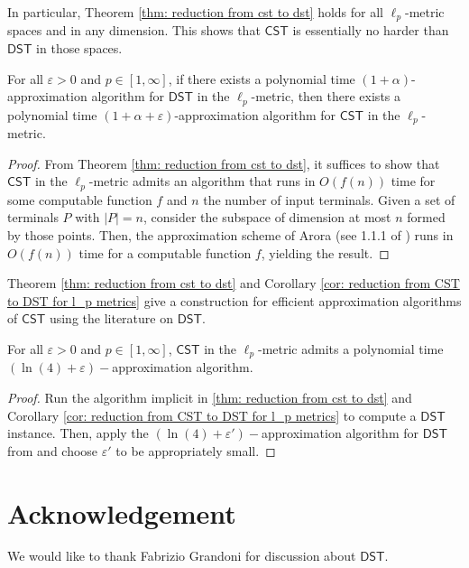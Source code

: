 \documentclass{article}\providecommand{\DeclareRedundantLanguages}[2]{}\usepackage[a4paper,margin=20mm]{geometry}
\newcommand{\1}{\textbf{1}}
\newcommand{\cst}{$\mathsf{CST}$\xspace}
\newcommand{\dst}{$\mathsf{DST}$\xspace}
\begin{document}
In particular, Theorem \ref{thm: reduction from cst to dst} holds for all $\ell_p$-metric spaces and in any dimension. This shows that \cst is essentially no harder than \dst in those spaces.
\begin{corollary} \label{cor: reduction from CST to DST for l_p metrics}
For all $\varepsilon > 0$ and $p \in [1, \infty]$, if there exists a polynomial time $(1 + \alpha)$-approximation algorithm for \dst in the $\ell_p$-metric, then there exists a polynomial time $(1 + \alpha + \varepsilon)$-approximation algorithm for \cst in the $\ell_p$-metric.
\end{corollary}
\begin{proof}
From Theorem \ref{thm: reduction from cst to dst}, it suffices to show that \cst in the $\ell_p$-metric admits an algorithm that runs in $O(f(n))$ time for some computable function $f$ and $n$ the number of input terminals. Given a set of terminals $P$ with $|P| = n$, consider the subspace of dimension at most $n$ formed by those points. Then, the approximation scheme of Arora (see 1.1.1 of \cite{Arora_1998}) runs in $O(f(n))$ time for a computable function $f$, yielding the result.
\end{proof}

Theorem \ref{thm: reduction from cst to dst} and Corollary \ref{cor: reduction from CST to DST for l_p metrics} give a construction for efficient approximation algorithms of \cst using the literature on \dst.
\begin{corollary}\label{cor:alg}
For all $\varepsilon > 0$ and $p \in [1, \infty]$,  \cst in the $\ell_p$-metric admits a polynomial time $(\ln(4) + \varepsilon)-$approximation algorithm.
\end{corollary}
\begin{proof}
Run the algorithm implicit in \ref{thm: reduction from cst to dst} and Corollary \ref{cor: reduction from CST to DST for l_p metrics} to compute a \dst instance. Then, apply the $(\ln(4) + \varepsilon')-$approximation algorithm for \dst from \cite{byrka2017improved} and choose $\varepsilon'$ to be appropriately small. 
\end{proof}


 \section*{Acknowledgement}
We would like to thank Fabrizio Grandoni for discussion about \dst.
\newpage
\end{document}
